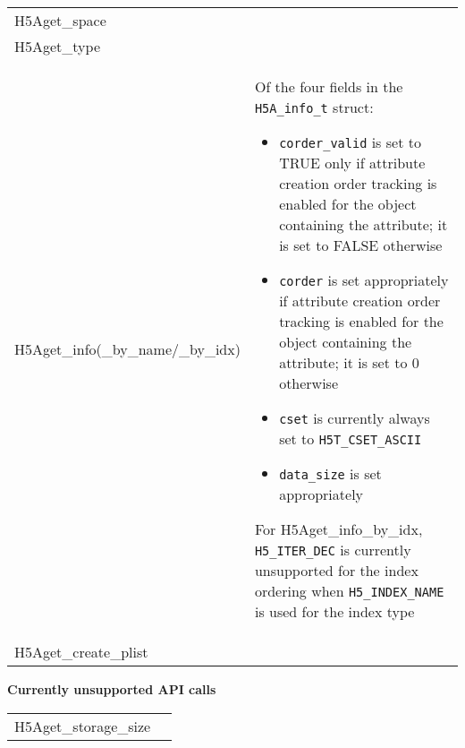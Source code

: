 \documentclass[../users_guide.tex]{subfiles}
\begin{document}
\begin{center}
\begin{tabularx}{\linewidth}{| X | >{\RaggedRight}X |}
\hline
\rowcolor{lightgray!50}%
\multicolumn{1}{| c |}{\textbf{API call}} & \multicolumn{1}{c |}{\textbf{Notes}} \\ \hline

H5Aget\_space & \\ \hline
H5Aget\_type & \\ \hline
H5Aget\_info(\_by\_name/\_by\_idx) & Of the four fields in the \texttt{H5A\_info\_t} struct:
                                     \begin{itemize}
                                         \item \texttt{corder\_valid} is set to TRUE only if attribute creation order tracking is enabled for the object containing the attribute; it is set to FALSE otherwise
                                         \item \texttt{corder} is set appropriately if attribute creation order tracking is enabled for the object containing the attribute; it is set to 0 otherwise
                                         \item \texttt{cset} is currently always set to \texttt{H5T\_CSET\_ASCII}
                                         \item \texttt{data\_size} is set appropriately
                                     \end{itemize}

                                     For H5Aget\_info\_by\_idx, \texttt{H5\_ITER\_DEC} is currently unsupported for the index ordering when \texttt{H5\_INDEX\_NAME} is used for the index type\\ \hline
H5Aget\_create\_plist & \\ \hline

\end{tabularx}

\textbf{Currently unsupported API calls}
\vspace{.1in} \\

\begin{tabularx}{\linewidth}{| X | >{\RaggedRight}X |}
\hline
\rowcolor{lightgray!50}%
\multicolumn{1}{| c |}{\textbf{API call}} & \multicolumn{1}{c |}{\textbf{Notes}} \\ \hline

H5Aget\_storage\_size\footnotemark[1] & \\ \hline

\end{tabularx}


\end{center}
\end{document}
